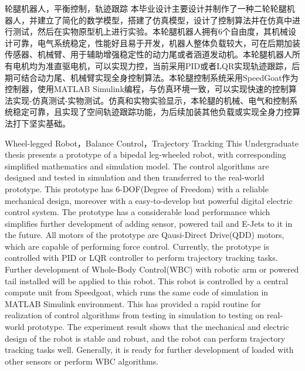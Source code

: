 \begin{中文摘要}{轮腿机器人，平衡控制，轨迹跟踪}
  本毕业设计主要设计并制作了一种二轮轮腿机器人，并建立了简化的数学模型，搭建了仿真模型，设计了控制算法并在仿真中进行测试，然后在实物原型机上进行实验。本轮腿机器人拥有6个自由度，其机械设计可靠，电气系统稳定，性能好且易于开发，机器人整体负载较大，可在后期加装传感器、机械臂、用于辅助增强稳定性的动力尾或者涵道发动机。本轮腿机器人所有电机均为准直驱电机，可以实现力控，当前采用PID或者LQR实现轨迹跟踪，后期可结合动力尾、机械臂实现全身控制算法。本轮腿控制系统采用SpeedGoat作为控制器，使用MATLAB Simulink编程，与仿真环境一致，可以实现快速的控制算法实现-仿真测试-实物测试。仿真和实物实验显示，本轮腿的机械、电气和控制系统稳定可靠，且实现了空间轨迹跟踪功能，为后续加装其他负载或实现全身力控算法打下坚实基础。 
\end{中文摘要}


\begin{英文摘要}{Wheel-legged Robot，Balance Control，Trajectory Tracking}
This Undergraduate thesis presents a prototype of a bipedal leg-wheeled robot, with corresponding simplified mathematics and simulation model. The control algorithms are designed and tested in simulation and then transferred to the real-world prototype. This prototype has 6-DOF(Degree of Freedom) with a reliable mechanical design, moreover with a easy-to-develop but powerful digital electric control system. The prototype has a considerable load performance which simplifies further development of adding sensor, powered tail and E-Jets to it in the future. All motors of the prototype are Qausi-Direct Drive(QDD) motors, which are capable of performing force control. Currently, the prototype is controlled with PID or LQR controller to perform trajectory tracking tasks. Further development of Whole-Body Control(WBC) with robotic arm or powered tail installed will be applied to this robot. This robot is controlled by a central compute unit from Speedgoat, which runs the same code of simulation in MATLAB Simulink environment. This has provided a rapid routine for realization of control algorithms from testing in simulation to testing on real-world prototype. The experiment result shows that the mechanical and electric design of the robot is stable and robust, and the robot can perform trajectory tracking tasks well. Generally, it is ready for further development of loaded with other sensors or perform WBC algorithms.
\end{英文摘要}
